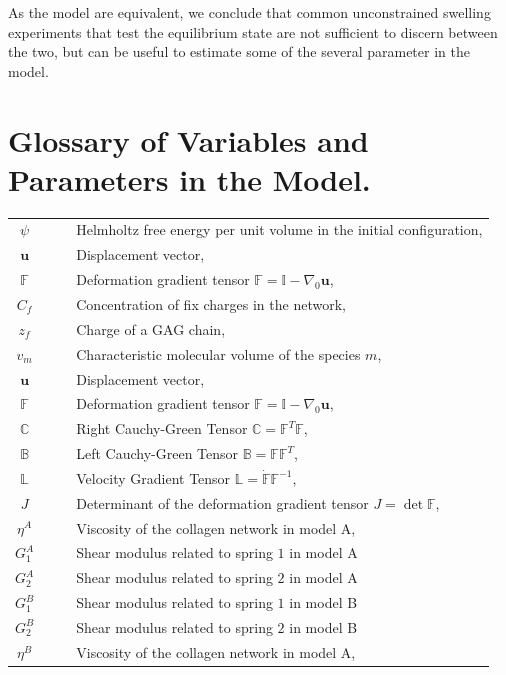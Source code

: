 \documentclass[runningheads]{llncs}
\newcommand{\F}{\ensuremath{\mathbb{F}}}
\newcommand{\LL}{\ensuremath{\mathbb{L}}}
\begin{document}
As the model are equivalent, we conclude that common unconstrained swelling experiments that test the equilibrium state are not sufficient to discern between the two, but can be useful to estimate some of the several parameter in the model. 



%


\newpage
\appendix
\section{Glossary of Variables and Parameters in the Model.}
\label{glos}
\begin{table}[h!]
\begin{tabular}{c  l}
	$\psi\qquad $ & Helmholtz free energy per unit volume in the initial configuration,\\
	$\mathbf{u}\qquad$ & Displacement vector,\\
	$\F\qquad$ & Deformation gradient tensor $\F=\mathbb{I}-\nabla_0\mathbf{u}$,\\
	$C_f\qquad$ & Concentration of fix charges in the network,\\
	$z_f\qquad$ & Charge of a GAG chain,\\
	$v_m\qquad$ & Characteristic molecular volume of the species $m$,\\
	$\mathbf{u}\qquad$ & Displacement vector,\\
	$\F\qquad$ & Deformation gradient tensor $\F=\mathbb{I}-\nabla_0\mathbf{u}$,\\	
	$\mathbb{C}\qquad$ & Right Cauchy-Green Tensor $\mathbb{C}=\F^T\F$,\\
	$\mathbb{B}\qquad$ & Left Cauchy-Green Tensor $\mathbb{B}=\F\F^T$,\\
	$\LL\qquad$ & Velocity Gradient Tensor $\LL=\dot{\F}\F^{-1}$,\\
	$J\qquad$ & Determinant of the deformation gradient tensor $J=\det \F$,\\
	$\eta^A\qquad $ & Viscosity of the collagen network in model A,\\
	$G^A_1\qquad$ & Shear modulus related to spring $1$ in model A\\
	$G^A_2\qquad$ & Shear modulus related to spring $2$ in model A\\
	$G^B_1\qquad$ & Shear modulus related to spring $1$ in model B\\
	$G^B_2\qquad$ & Shear modulus related to spring $2$ in model B\\
	$\eta^B\qquad$ & Viscosity of the collagen network in model A,\\

\end{tabular}
\end{table}
\end{document}
